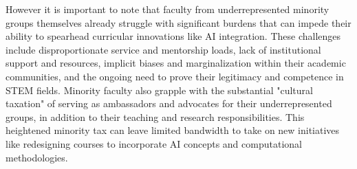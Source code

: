 \documentclass[11pt]{article}
\begin{document}







However it is important to note that faculty from underrepresented minority groups themselves already struggle with significant burdens that can impede their ability to spearhead curricular innovations like AI integration. These challenges include disproportionate service and mentorship loads, lack of institutional support and resources, implicit biases and marginalization within their academic communities, and the ongoing need to prove their legitimacy and competence in STEM fields. Minority faculty also grapple with the substantial "cultural taxation" of serving as ambassadors and advocates for their underrepresented groups, in addition to their teaching and research responsibilities. This heightened minority tax can leave limited bandwidth to take on new initiatives like redesigning courses to incorporate AI concepts and computational methodologies. 
\end{document}
